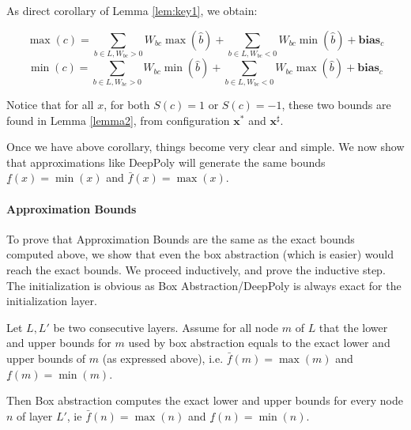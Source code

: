 	As direct corollary of Lemma \ref{lem:key1}, we obtain:
	
	\begin{corollary}
		\label{cor1}
		$$\max(c)=\sum_{b \in L, W_{bc}>0}W_{bc} \max(\hat{b}) + \sum_{b \in L, W_{bc}<0}W_{bc} \min(\hat{b}) + \boldsymbol{bias}_c$$
		$$\min(c)=\sum_{b \in L, W_{bc}>0}W_{bc} \min(\hat{b}) + \sum_{b \in L, W_{bc}<0}W_{bc} \max(\hat{b}) + \boldsymbol{bias}_c$$
	\end{corollary}
	
	
	Notice that for all $x$, for both $S(c)=1$ or $S(c)=-1$, these two bounds are found in Lemma \ref{lemma2},
	from configuration $\boldsymbol{x}^*$ and $\boldsymbol{x}^\sharp$.
	
	
	
	Once we have above corollary, things become very clear and simple. We now show that approximations like DeepPoly will generate the same bounds 
	$\underline{f}(x)=\min(x)$ and $\bar{f}(x)=\max(x)$.
	
	\paragraph{Approximation Bounds}
	
	To prove that Approximation Bounds are the same as the exact bounds computed above, 
	we show that even the box abstraction (which is easier) would reach the exact bounds.
	We proceed inductively, and prove the inductive step.
	The initialization is obvious as Box Abstraction/DeepPoly is always exact for the initialization layer.
	
	\begin{lemma}
		Let $L,L'$ be two consecutive layers.
		Assume for all node $m$ of $L$ that the lower and upper bounds for $m$ used by box abstraction equals to the exact lower and upper bounds of $m$ (as expressed above), i.e.
		$\bar{f}(m)=\max(m)$ and $\underline{f}(m)=\min(m)$.
		
		Then Box abstraction computes the exact lower and upper bounds for every node $n$ of layer $L'$, ie $\bar{f}(n)=\max(n)$ and $\underline{f}(n)=\min(n)$.
	\end{lemma}
	
